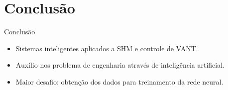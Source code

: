 \section{Conclusão}

\begin{frame}{Conclusão}
\begin{itemize}
    \item Sistemas inteligentes aplicados a SHM e controle de VANT.
    \item Auxílio nos problema de engenharia através de inteligência artificial.
    \item \alert{Maior desafio:} obtenção dos dados para treinamento da rede neural.
\end{itemize}
\end{frame}

{
\begin{frame}
	\titlepage
\end{frame}
}